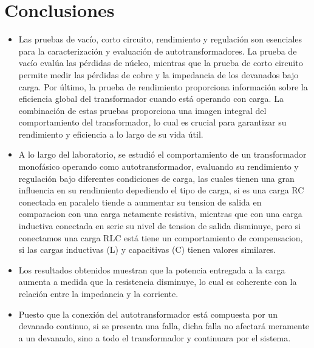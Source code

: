 \section*{Conclusiones}

\begin{itemize}
    \item Las pruebas de vacío, corto circuito, rendimiento y regulación son esenciales para la caracterización y evaluación de autotransformadores. La prueba de vacío evalúa las pérdidas de núcleo, mientras que la prueba de corto circuito permite medir las pérdidas de cobre y la impedancia de los devanados bajo carga. Por último, la prueba de rendimiento proporciona información sobre la eficiencia global del transformador cuando está operando con carga. La combinación de estas pruebas proporciona una imagen integral del comportamiento del transformador, lo cual es crucial para garantizar su rendimiento y eficiencia a lo largo de su vida útil.
    \vspace{0.3cm}
    \item A lo largo del laboratorio, se estudió el comportamiento de un transformador monofásico operando como autotransformador, evaluando su rendimiento y regulación bajo diferentes condiciones de carga, las cuales tienen una gran influencia en su rendimiento depediendo el tipo de carga, si es una carga RC conectada en paralelo tiende a aunmentar su tension de salida en comparacion con una carga netamente resistiva, mientras que con una carga inductiva conectada en serie su nivel de tension de salida disminuye, pero si conectamos una carga RLC está tiene un comportamiento de compensacion, si las cargas inductivas (L) y capacitivas (C) tienen valores similares.
    \vspace{0.3cm}
    \item Los resultados obtenidos muestran que la potencia entregada a la carga aumenta a medida que la resistencia disminuye, lo cual es coherente con la relación entre la impedancia y la corriente.    
    \vspace{0.3cm}
    \item Puesto que la conexión del autotransformador está compuesta por un devanado continuo, si se presenta una falla, dicha falla no afectará meramente a un devanado, sino a todo el transformador y continuara por el sistema.
\end{itemize}

